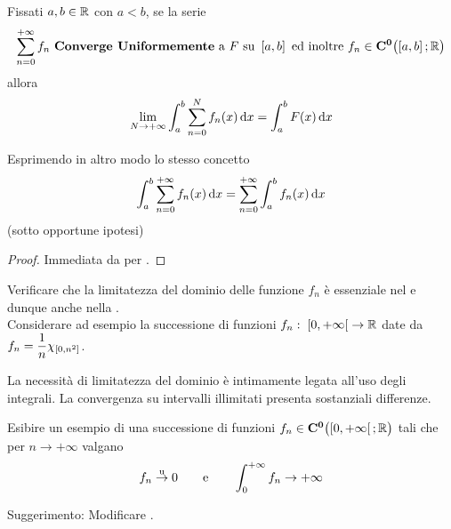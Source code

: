 \begin{corollary}
	Fissati $a, b \in \mathbb{R}$ con $a < b$, se la serie
	\[\sum\limits_{n = 0}^{+\infty} f_n \text{ \textbf{Converge Uniformemente} a } F \text{ su } \left[a,b\right] \text{ ed inoltre } f_n \in \mathbf{C^{0}}\bigl( \left[a,b\right]; \mathbb{R} \bigr)\]
	allora
	\[\lim\limits_{N \to +\infty} \int_{a}^{b} \sum\limits_{n = 0}^{N} f_n(x) \,\mathrm{d}{x} = \int_{a}^{b} F(x) \,\mathrm{d}{x}\]
	\begin{note}
		Esprimendo in altro modo lo stesso concetto
		\[
			\int_{a}^{b} \sum\limits_{n = 0}^{+\infty} f_n(x) \,\mathrm{d}{x} =
			\sum\limits_{n = 0}^{+\infty} \int_{a}^{b} f_n(x) \,\mathrm{d}{x}
		\]
		(sotto opportune ipotesi)
	\end{note}
	\begin{proof}
		Immediata da  per .
	\end{proof}
\end{corollary}
\begin{exercise}
	\label{ex:verif_imporanz_limit_dom_integr}
	Verificare che la limitatezza del dominio delle funzione $f_n$ è essenziale nel  e dunque anche nella .\\
	Considerare ad esempio la successione di funzioni $f_n:\; \left[0,+\infty\right[ \to \mathbb{R}$ date da $\displaystyle f_n = \frac{1}{n}\chi_{\left[0,n^2\right]}$.
	\begin{solution}
		La necessità di limitatezza del dominio è intimamente legata all'uso degli integrali. La convergenza su intervalli illimitati presenta sostanziali differenze.
	\end{solution}
\end{exercise}
\begin{exercise}
	Esibire un esempio di una successione di funzioni $f_n \in \mathbf{C^{0}} \bigl( \left[0,+\infty\right[; \mathbb{R} \bigr)$ tali che per $n \to +\infty$ valgano
	\[f_n \overset{\text{u}}{\to} 0 \qquad \text{e} \qquad \int_{0}^{+\infty} f_n \to +\infty\]
	\begin{solution}
		Suggerimento: Modificare .
	\end{solution}
\end{exercise}
